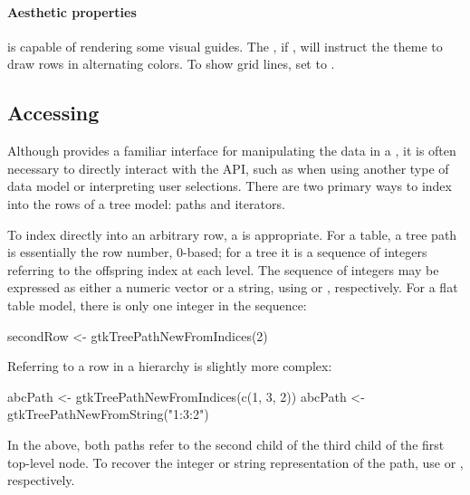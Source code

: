 \paragraph{Aesthetic properties}

 is capable of rendering some visual guides. The
, if , will instruct the theme to draw
rows in alternating colors. To show grid lines, set
 to .

\subsection{Accessing }
\label{sec:RGtk2:mvc:iterators}

Although  provides a familiar interface for
manipulating the data in a , it is often necessary
to directly interact with the \GTK\/ API, such as when using another
type of data model or interpreting user selections. There are two
primary ways to index into the rows of a tree model: paths and
iterators.

To index directly into an arbitrary row, a  is
appropriate. For a table, a tree path is essentially the row number,
$0$-based; for a tree it is a sequence of integers referring to the
offspring index at each level. The sequence of integers may be
expressed as either a numeric vector or a string, using
 or
, respectively. For a flat table
model, there is only one integer in the sequence:
\begin{Schunk}
\begin{Sinput}
 secondRow <- gtkTreePathNewFromIndices(2)
\end{Sinput}
\end{Schunk}
%
Referring to a row in a hierarchy is slightly more complex:
\begin{Schunk}
\begin{Sinput}
 abcPath <- gtkTreePathNewFromIndices(c(1, 3, 2))
 abcPath <- gtkTreePathNewFromString("1:3:2")
\end{Sinput}
\end{Schunk}
%
In the above, both paths refer to the second child of the third child
of the first top-level node. To recover the integer or string
representation of the path, use  or
, respectively.


